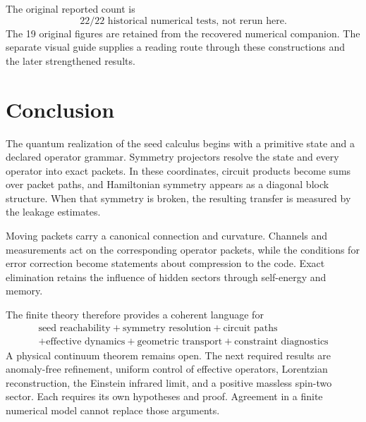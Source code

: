 The original reported count is
\[
\boxed{22/22\text{ historical numerical tests, not rerun here}.}
\]
The 19 original figures are retained from the recovered numerical companion. The separate visual guide supplies a reading route through these constructions and the later strengthened results.

\setcounter{section}{14}
\section{Conclusion}\label{core:section:014}

The quantum realization of the seed calculus begins with a primitive state and a declared operator grammar. Symmetry projectors resolve the state and every operator into exact packets. In these coordinates, circuit products become sums over packet paths, and Hamiltonian symmetry appears as a diagonal block structure. When that symmetry is broken, the resulting transfer is measured by the leakage estimates.

Moving packets carry a canonical connection and curvature. Channels and measurements act on the corresponding operator packets, while the conditions for error correction become statements about compression to the code. Exact elimination retains the influence of hidden sectors through self-energy and memory.

The finite theory therefore provides a coherent language for
\[
\boxed{
\begin{gathered}
\text{seed reachability}
+
\text{symmetry resolution}
+
\text{circuit paths}\\
+
\text{effective dynamics}
+
\text{geometric transport}
+
\text{constraint diagnostics}
\end{gathered}
}
\]
A physical continuum theorem remains open. The next required results are anomaly-free refinement, uniform control of effective operators, Lorentzian reconstruction, the Einstein infrared limit, and a positive massless spin-two sector. Each requires its own hypotheses and proof. Agreement in a finite numerical model cannot replace those arguments.


